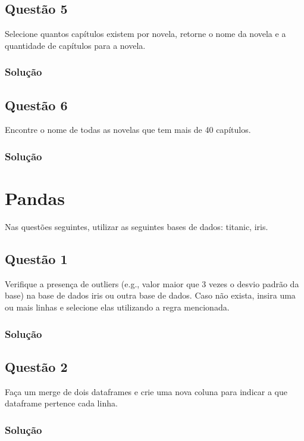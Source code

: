 \documentclass{assignment}
\begin{document}
\subsection*{Questão 5}
Selecione quantos capítulos existem por novela, retorne o nome da novela e a quantidade de
capítulos para a novela.
\subsubsection*{Solução}


\subsection*{Questão 6}
Encontre o nome de todas as novelas que tem mais de 40 capítulos.
\subsubsection*{Solução}


\section*{Pandas}

Nas questões seguintes, utilizar as seguintes bases de dados: titanic, iris.

\subsection*{Questão 1}
Verifique a presença de outliers (e.g., valor maior que 3 vezes o desvio padrão da base) na base
de dados iris ou outra base de dados. Caso não exista, insira uma ou mais linhas e selecione elas
utilizando a regra mencionada.
\subsubsection*{Solução}


\subsection*{Questão 2}
Faça um merge de dois dataframes e crie uma nova coluna para indicar a que dataframe pertence
cada linha.
\subsubsection*{Solução}

\end{document}
